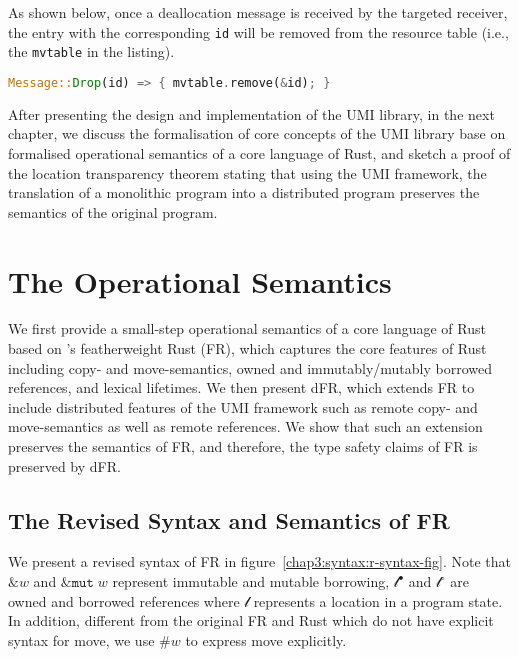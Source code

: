 As shown below, once a deallocation message is received by the targeted receiver, the entry with the corresponding \texttt{id} will be removed from the resource table (i.e., the \texttt{mvtable} in the listing). 
\begin{lstlisting}[language=Rust, style=boxed, basicstyle=\footnotesize\ttfamily]
Message::Drop(id) => { mvtable.remove(&id); }
\end{lstlisting}

After presenting the design and implementation of the UMI library, in the next chapter, we discuss the formalisation of core concepts of the UMI library base on formalised operational semantics of a core language of Rust, and sketch a proof of the location transparency theorem stating that using the UMI framework, the translation of a monolithic program into a distributed program preserves the semantics of the original program.

\section{The Operational Semantics}
\label{chap3:semantics}
We first provide a small-step operational semantics of a core language of Rust based on \citet{10.1145/3443420}'s featherweight Rust (FR), which captures the core features of Rust including copy- and move-semantics, owned and immutably/mutably borrowed references, and lexical lifetimes. We then present dFR, which extends FR to include distributed features of the UMI framework such as remote copy- and move-semantics as well as remote references. We show that such an extension preserves the semantics of FR, and therefore, the type safety claims of FR is preserved by dFR.

\subsection{The Revised Syntax and Semantics of FR}
\label{chap3:semantics:fr}
We present a revised syntax of FR in figure~\ref{chap3:syntax:r-syntax-fig}. Note that $\&w$ and $\&\texttt{mut}\;w$ represent immutable and mutable borrowing, $\mathscr{l}^\bullet$ and $\mathscr{l}^\circ$ are owned and borrowed references where $\mathscr{l}$ represents a location in a program state. In addition, different from the original FR and Rust which do not have explicit syntax for move, we use $\#w$ to express move explicitly.

